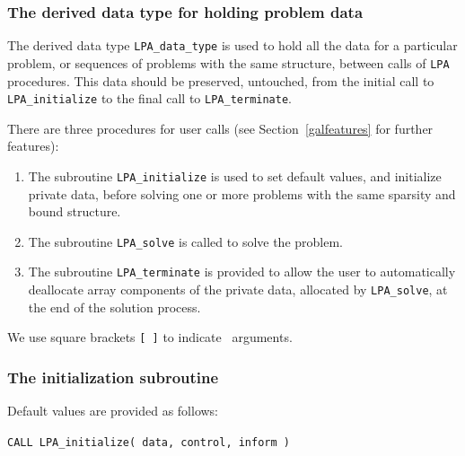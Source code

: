 \documentclass{galahad}
\newcommand{\packagename}{LPA}
\begin{document}



\subsubsection{The derived data type for holding problem data}\label{typedata}
The derived data type
{\tt \packagename\_data\_type}
is used to hold all the data for a particular problem,
or sequences of problems with the same structure, between calls of
{\tt \packagename} procedures.
This data should be preserved, untouched, from the initial call to
{\tt \packagename\_initialize}
to the final call to
{\tt \packagename\_terminate}.


\galarguments
There are three procedures for user calls
(see Section~\ref{galfeatures} for further features):

\begin{enumerate}
\item The subroutine
      {\tt \packagename\_initialize}
      is used to set default values, and initialize private data,
      before solving one or more problems with the
      same sparsity and bound structure.
\item The subroutine
      {\tt \packagename\_solve}
      is called to solve the problem.
\item The subroutine
      {\tt \packagename\_terminate}
      is provided to allow the user to automatically deallocate array
       components of the private data, allocated by
       {\tt \packagename\_solve},
       at the end of the solution process.
\end{enumerate}
We use square brackets {\tt [ ]} to indicate \optional\ arguments.


\subsubsection{The initialization subroutine}\label{subinit}
 Default values are provided as follows:
\vspace*{1mm}

\hspace{8mm}
{\tt CALL \packagename\_initialize( data, control, inform )}
\end{document}
